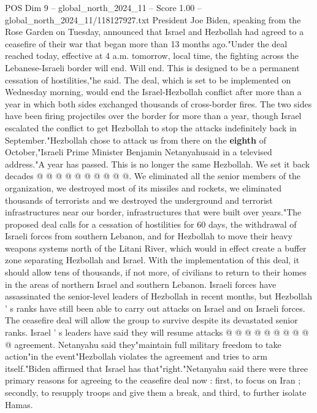 \begin{textsample}{POS Dim 9 – global\_north\_2024\_11 – Score 1.00 – global\_north\_2024\_11/118127927.txt}  \label{ex:f9_pos_401}
President Joe Biden, speaking from the Rose Garden on Tuesday, announced that Israel and Hezbollah had agreed to a ceasefire of their war that began more than 13 months ago."Under the deal reached today, effective at 4 a.m. tomorrow, local time, the fighting across the Lebanese-Israeli border will end.
Will end.
This is designed to be a permanent cessation of hostilities,"he said.
The deal, which is set to be implemented on Wednesday morning, would end the Israel-Hezbollah conflict after more than a year in which both sides exchanged thousands of cross-border fires.
The two sides have been firing projectiles over the border for more than a year, though Israel escalated the conflict to get Hezbollah to stop the attacks indefinitely back in September."Hezbollah chose to attack us from there on the \textbf{eighth} of October,"Israeli Prime Minister Benjamin Netanyahusaid in a televised address."A year has passed.
This is no longer the same Hezbollah.
We set it back decades @ @ @ @ @ @ @ @ @ @.
We eliminated all the senior members of the organization, we destroyed most of its missiles and rockets, we eliminated thousands of terrorists and we destroyed the underground and terrorist infrastructures near our border, infrastructures that were built over years."The proposed deal calls for a cessation of hostilities for 60 days, the withdrawal of Israeli forces from southern Lebanon, and for Hezbollah to move their heavy weapons systems north of the Litani River, which would in effect create a buffer zone separating Hezbollah and Israel.
With the implementation of this deal, it should allow tens of thousands, if not more, of civilians to return to their homes in the areas of northern Israel and southern Lebanon.
Israeli forces have assassinated the senior-level leaders of Hezbollah in recent months, but Hezbollah ' s ranks have still been able to carry out attacks on Israel and on Israeli forces.
The ceasefire deal will allow the group to survive despite its devastated senior ranks.
Israel ' s leaders have said they will resume attacks @ @ @ @ @ @ @ @ @ @ agreement.
Netanyahu said they"maintain full military freedom to take action"in the event"Hezbollah violates the agreement and tries to arm itself."Biden affirmed that Israel has that"right."Netanyahu said there were three primary reasons for agreeing to the ceasefire deal now : first, to focus on Iran ; secondly, to resupply troops and give them a break, and third, to further isolate Hamas.

\end{textsample}
